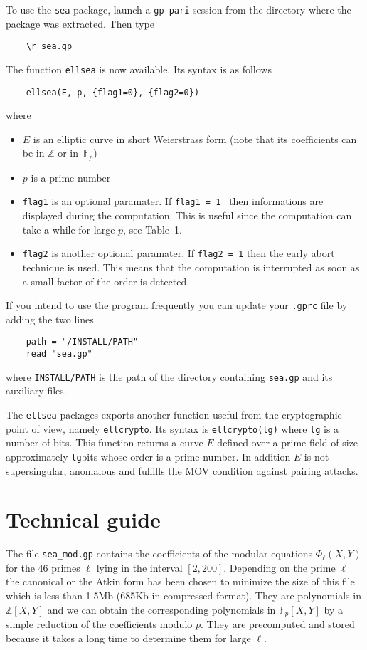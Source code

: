 \documentclass[11pt]{article}
\def\ellsea{\texttt{ellsea}\xspace}
\begin{document}
To use the {\tt sea} package, launch a {\tt gp-pari} session from the directory
where the package was extracted. Then type
\begin{verbatim}
    \r sea.gp
\end{verbatim}
The function \ellsea is now available. Its syntax is as follows
\begin{verbatim}
    ellsea(E, p, {flag1=0}, {flag2=0})
\end{verbatim}
where
\begin{itemize}
\item $E$ is an elliptic curve in short Weierstrass form (note that its
coefficients can be in $\mathbb{Z}$ or in~$\mathbb{F}_p$)
\item $p$ is a prime number
\item {\tt flag1} is an optional paramater. If {\tt flag1 = 1 } then
informations are displayed during the computation. This is useful since the
computation can take a while for large $p$, see Table~1.

\item {\tt flag2} is another optional paramater. If {\tt flag2 = 1} then the
early abort technique is used. This means that the computation is interrupted
as soon as a small factor of the order is detected.
\end{itemize}

If you intend to use the program frequently you can update your {\tt .gprc}
file by adding the two lines
\begin{verbatim}
    path = "/INSTALL/PATH"
    read "sea.gp"
\end{verbatim}
where {\tt INSTALL/PATH} is the path of the directory containing {\tt sea.gp}
and its auxiliary files.

The \ellsea packages exports another function useful from the cryptographic
point of view, namely {\tt ellcrypto}. Its syntax is {\tt ellcrypto(lg)}
where {\tt lg} is a number of bits. This function returns a curve $E$ defined
over a prime field of size approximately {\tt lg}bits whose order is a prime
number. In addition $E$ is not supersingular, anomalous and fulfills the MOV
condition against pairing attacks.

\section{Technical guide} \label{deux}

The file {\tt sea\_mod.gp} contains the coefficients of the modular equations
$\Phi_\ell(X, Y)$  for the $46$ primes $\ell$ lying in the interval $[2, 200]$.
Depending on the prime $\ell$ the canonical or the Atkin form has been chosen
to minimize the size of this file which is less than 1.5Mb (685Kb in compressed
format). They are polynomials in $\mathbb{Z}[X,Y]$ and we can obtain the
corresponding polynomials in $\mathbb{F}_p[X,Y]$ by a simple reduction of the
coefficients modulo $p$. They are precomputed and stored because it takes a
long time to determine them for large $\ell$.
\end{document}
